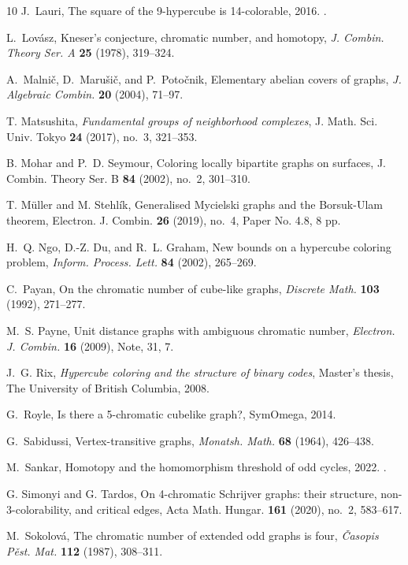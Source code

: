 \documentclass[12pt,letterpaper]{amsart}
\theoremstyle{definition}
\theoremstyle{remark}
\begin{document}
\begin{thebibliography}{10}
J.~Lauri, The square of the 9-hypercube is 14-colorable, 2016.
  .

L.~Lov\'asz, Kneser's conjecture, chromatic number, and homotopy, \emph{J.
  Combin. Theory Ser. A} \textbf{25} (1978), 319--324.

A.~Malni\v{c}, D.~Maru\v{s}i\v{c}, and P.~Poto\v{c}nik, Elementary abelian
  covers of graphs, \emph{J. Algebraic Combin.} \textbf{20} (2004), 71--97.

T. Matsushita, \emph{Fundamental groups of neighborhood complexes}, J. Math. Sci. Univ. Tokyo \textbf{24} (2017), no.~3, 321--353.

B. Mohar and P.~D. Seymour, Coloring locally bipartite graphs on surfaces, J. Combin. Theory Ser. B {\bf 84} (2002), no.~2, 301--310.

T. M\"uller and M. Stehl\'ik, Generalised Mycielski graphs and the Borsuk-Ulam theorem, Electron. J. Combin. {\bf 26} (2019), no.~4, Paper No. 4.8, 8 pp.

H.~Q. Ngo, D.-Z. Du, and R.~L. Graham, New bounds on a hypercube coloring
  problem, \emph{Inform. Process. Lett.} \textbf{84} (2002), 265--269.

C.~Payan, On the chromatic number of cube-like graphs, \emph{Discrete Math.}
  \textbf{103} (1992), 271--277.

M.~S. Payne, Unit distance graphs with ambiguous chromatic number,
  \emph{Electron. J. Combin.} \textbf{16} (2009), Note, 31, 7.

J.~G. Rix, \emph{Hypercube coloring and the structure of binary codes},
  Master's thesis, The University of British Columbia, 2008.

G.~Royle, Is there a 5-chromatic cubelike graph?, SymOmega, 2014.

G.~Sabidussi, Vertex-transitive graphs, \emph{Monatsh. Math.} \textbf{68}
  (1964), 426--438.

M.~Sankar, Homotopy and the homomorphism threshold of odd cycles, 2022.
  .

 G. Simonyi and G. Tardos, On 4-chromatic Schrijver graphs: their structure, non-3-colorability, and critical edges, Acta Math. Hungar. {\bf 161} (2020), no.~2, 583--617.

M.~Sokolov\'{a}, The chromatic number of extended odd graphs is four,
  \emph{\v{C}asopis P\v{e}st. Mat.} \textbf{112} (1987), 308--311.


\end{thebibliography}
\end{document}
